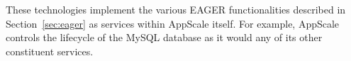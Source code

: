 
%

These technologies implement the various EAGER functionalities described in
Section~\ref{sec:eager} as services within AppScale itself.  For example, AppScale
controls the lifecycle of the MySQL database as it would any of its other
constituent services.
